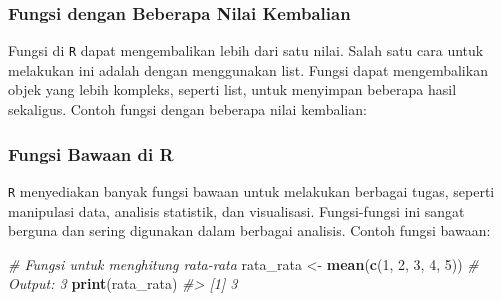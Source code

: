 \documentclass[
  oneside]{book}
\newenvironment{Shaded}{\begin{snugshade}}{\end{snugshade}}
\newcommand{\AttributeTok}[1]{\textcolor[rgb]{0.13,0.29,0.53}{#1}}
\newcommand{\CommentTok}[1]{\textcolor[rgb]{0.56,0.35,0.01}{\textit{#1}}}
\newcommand{\ControlFlowTok}[1]{\textcolor[rgb]{0.13,0.29,0.53}{\textbf{#1}}}
\newcommand{\DecValTok}[1]{\textcolor[rgb]{0.00,0.00,0.81}{#1}}
\newcommand{\FunctionTok}[1]{\textcolor[rgb]{0.13,0.29,0.53}{\textbf{#1}}}
\newcommand{\NormalTok}[1]{#1}
\newcommand{\OtherTok}[1]{\textcolor[rgb]{0.56,0.35,0.01}{#1}}
\newcommand{\SpecialCharTok}[1]{\textcolor[rgb]{0.81,0.36,0.00}{\textbf{#1}}}
\begin{document}
\subsubsection*{Fungsi dengan Beberapa Nilai Kembalian}\label{fungsi-dengan-beberapa-nilai-kembalian}

Fungsi di \texttt{R} dapat mengembalikan lebih dari satu nilai.
Salah satu cara untuk melakukan ini adalah dengan menggunakan list.
Fungsi dapat mengembalikan objek yang lebih kompleks, seperti list,
untuk menyimpan beberapa hasil sekaligus. Contoh fungsi dengan beberapa
nilai kembalian:

\begin{Shaded}
\end{Shaded}

\subsubsection*{Fungsi Bawaan di R}\label{fungsi-bawaan-di-r}

\texttt{R} menyediakan banyak fungsi bawaan untuk melakukan
berbagai tugas, seperti manipulasi data, analisis statistik, dan
visualisasi. Fungsi-fungsi ini sangat berguna dan sering digunakan dalam
berbagai analisis. Contoh fungsi bawaan:

\begin{Shaded}
\begin{Highlighting}[]
\CommentTok{\# Fungsi untuk menghitung rata{-}rata}
\NormalTok{rata\_rata }\OtherTok{\textless{}{-}} \FunctionTok{mean}\NormalTok{(}\FunctionTok{c}\NormalTok{(}\DecValTok{1}\NormalTok{, }\DecValTok{2}\NormalTok{, }\DecValTok{3}\NormalTok{, }\DecValTok{4}\NormalTok{, }\DecValTok{5}\NormalTok{))  }\CommentTok{\# Output: 3}
\FunctionTok{print}\NormalTok{(rata\_rata)}
\CommentTok{\#\textgreater{} [1] 3}
\end{Highlighting}
\end{Shaded}
\end{document}
